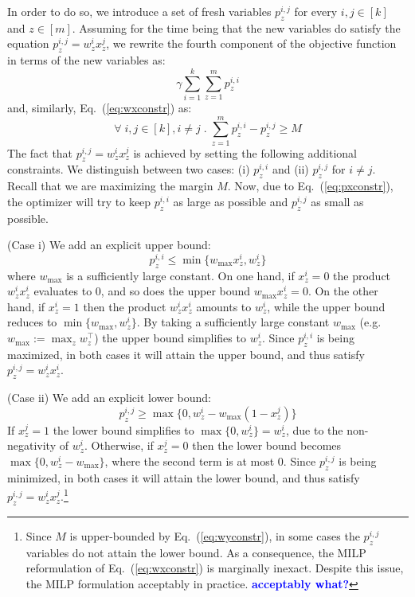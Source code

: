 \documentclass{article}
\renewcommand\[{\begin{equation}}
\renewcommand\]{\end{equation}}
\newcommand{\andrea}[1]{{\bf \textcolor{blue}{{\fbox{Andrea:} #1}}}}
\begin{document}
In order to do so, we introduce a set of fresh variables $p^{i,j}_z$ for every
$i,j\in[k]$ and $z\in[m]$. Assuming for the time being that the new variables
do satisfy the equation $p^{i,j}_z = w^i_z x^j_z$, we rewrite the fourth
component of the objective function in terms of the new variables as:
%
$$ \gamma \sum_{i=1}^k \sum_{z=1}^m p^{i,i}_z $$
%
and, similarly, Eq.~(\ref{eq:wxconstr}) as:
%
\[ \forall \; i, j \in [k], i \neq j \;.\; \sum_{z=1}^m p^{i,i}_z - p^{i,j}_z \ge M \label{eq:pxconstr} \]
%
The fact that $p^{i,j}_z = w^{i}_z x^{j}_z$ is achieved by
setting the following additional constraints. We distinguish between two cases:
(i) $p^{i,i}_z$ and (ii) $p^{i,j}_z$ for $i \ne j$.  Recall that we are
maximizing the margin $M$. Now, due to Eq.~(\ref{eq:pxconstr}), the optimizer will
try to keep $p^{i,i}_z$ as large as possible and $p^{i,j}_z$ as small as
possible.

(Case i) We add an explicit upper bound:
%
$$ p^{i,i}_z \le \min \{ w_\text{max} x^{i}_z, w^{i}_z \} $$
%
where $w_\text{max}$ is a sufficiently large constant.
On one hand, if $x^i_z = 0$ the product $w^i_z x^i_z$ evaluates to $0$, and so does
the upper bound $w_\text{max} x^{i}_z = 0$. On the other hand, if $x^i_z=1$
then the product $w^i_z x^i_z$ amounts to $w^i_z$, while the upper
bound reduces to $\min \{ w_\text{max}, w^{i}_z \}$. By taking a sufficiently
large constant $w_\text{max}$ (e.g. $w_\text{max} := \max_z w^\top_z$) the
upper bound simplifies to $w^i_z$. Since $p^{i,i}_z$ is being maximized, in
both cases it will attain the upper bound, and thus satisfy $p^{i,j}_z = w^i_z x^i_z$.

(Case ii) We add an explicit lower bound:
%
$$ p^{i,j}_z \ge \max \{ 0, w^{i}_z - w_\text{max}(1 - x^{j}_z) \} $$
%
If $x^j_z = 1$ the lower bound simplifies to $\max \{ 0, w^{i}_z \} = w^{i}_z$,
due to the non-negativity of $w^i_z$. Otherwise, if $x^j_z = 0$
then the lower bound becomes $\max \{ 0, w^{i}_z - w_\text{max} \}$, where
the second term is at most $0$. Since $p^{i,j}_z$ is being minimized, in both
cases it will attain the lower bound, and thus satisfy $p^{i,j}_z = w^i_z
x^j_z$.\footnote{Since $M$ is upper-bounded by Eq.~(\ref{eq:wyconstr}), in some
cases the $p^{i,j}_z$ variables do not attain the lower bound. As a
consequence, the MILP reformulation of Eq.~(\ref{eq:wxconstr}) is marginally
inexact. Despite this issue, the MILP formulation acceptably in practice. \andrea{acceptably what?}}
\end{document}
